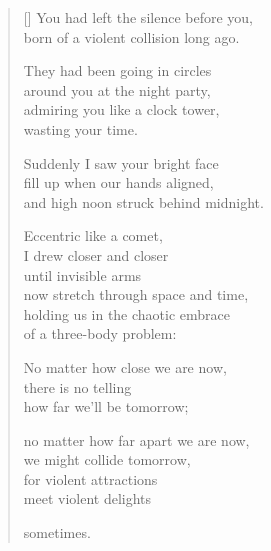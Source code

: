 \documentclass[12pt,a4paper]{article}
\begin{document}
\thispagestyle{empty}


\settowidth{\versewidth}{born of a violent collision long ago.}

\bigskip

\begin{verse}[\versewidth]
You had left the silence before you, \\
born of a violent collision long ago.

They had been going in circles \\
around you at the night party, \\
admiring you like a clock tower, \\
wasting your time.

Suddenly I saw your bright face \\
fill up when our hands aligned, \\
and high noon struck behind midnight.

Eccentric like a comet, \\
I drew closer and closer \\
until invisible arms \\
now stretch through space and time, \\
holding us in the chaotic embrace \\
of a three-body problem:

No matter how close we are now, \\
there is no telling \\
how far we'll be tomorrow;

no matter how far apart we are now, \\
we might collide tomorrow, \\
for violent attractions \\
meet violent delights

sometimes.
\end{verse}
\end{document}
